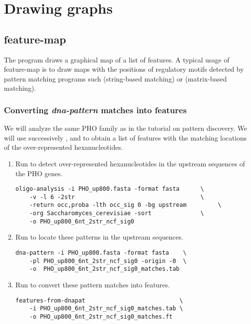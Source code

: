 
\section{Drawing graphs}


\subsection{feature-map}

The program  draws a graphical map of a list of
features. A typical usage of feature-map is to draw maps with the
positions of regulatory motifs detected by pattern matching programs
such  (string-based matching) or 
(matrix-based matching).

\subsubsection{Converting \textit{dna-pattern} matches into features}

We will analyze the same PHO family as in the tutorial on pattern
discovery. We will use successively ,
 and  to obtain a
list of features with the matching locations of the over-represented
hexanucleotides.

\begin{enumerate}

\item Run  to detect over-represented 
hexanucleotides in the upstream sequences of the PHO
genes.

\begin{verbatim} 
oligo-analysis -i PHO_up800.fasta -format fasta      \
    -v -l 6 -2str                                    \
    -return occ,proba -lth occ_sig 0 -bg upstream         \
    -org Saccharomyces_cerevisiae -sort              \
    -o PHO_up800_6nt_2str_ncf_sig0 
\end{verbatim}

\item Run \program{dna-pattern} to locate these patterns in 
the upstream sequences.

\begin{verbatim} 
dna-pattern -i PHO_up800.fasta -format fasta    \
    -pl PHO_up800_6nt_2str_ncf_sig0 -origin -0  \
    -o  PHO_up800_6nt_2str_ncf_sig0_matches.tab
\end{verbatim}

\item Run  to convert these pattern 
matches into features.

\begin{verbatim}
features-from-dnapat                           \
    -i PHO_up800_6nt_2str_ncf_sig0_matches.tab \
    -o PHO_up800_6nt_2str_ncf_sig0_matches.ft 
\end{verbatim}

\end{enumerate}

